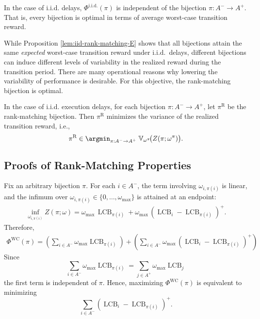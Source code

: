 \documentclass[opre,blindrev]{informs3}
\newcommand{\LCB}{\operatorname{LCB}}
\begin{document}
\begin{APPENDICES}
\begin{proposition}
\label{lem:iid-rank-matching-E}
In the case of i.i.d. delays, \(\Phi^{\mathrm{i.i.d.}}(\pi)\) is independent of the bijection \(\pi:A^-\to A^+\). That is, every bijection is optimal in terms of average worst-case transition reward.
\end{proposition}

While Proposition \ref{lem:iid-rank-matching-E} shows that all bijections attain the same \emph{expected} worst-case transition reward under i.i.d.\ delays, different bijections can induce different levels of variability in the realized reward during the transition period. There are many operational reasons why lowering the variability of performance is desirable. For this objective, the rank-matching bijection is optimal.

\begin{proposition}\label{lem:iid-rank-matching-Var} 
In the case of i.i.d. execution delays, for each bijection \(\pi:A^-\to A^+\), let \(\pi^{\mathrm{R}}\) be the rank-matching bijection. Then \(\pi^{\mathrm{R}}\) minimizes the variance of the realized transition reward, i.e., 
    \[
    \pi^{\mathrm{R}} \in \argmin_{\pi:A^-\to A^+}\; \mathbb{V}_{\omega^{\pi}}\!\bigl(Z(\pi;\omega^{\pi})\bigr).
    \]
\end{proposition}

\subsection{Proofs of Rank-Matching Properties}

    Fix an arbitrary bijection \(\pi\). For each \(i\in A^-\), the term involving \(\omega_{i,\pi(i)}\) is linear, and the infimum over \(\omega_{i,\pi(i)}\in\{0,\dots,\omega_{\max}\}\) is attained at an endpoint:
    \begin{eqnarray*}
    \inf_{\omega_{i,\pi(i)}}Z(\pi;\omega )=
       \omega_{\max}\,\LCB_{\pi(i)} + \omega_{\max}\,(\LCB_i-\LCB_{\pi(i)})^+.
    \end{eqnarray*}
    Therefore, 
   \begin{eqnarray*}
        \Phi^{\mathrm{WC}}(\pi)= \left(\sum_{i\in A^-}\omega_{\max}\LCB_{\pi(i)}\right)+ \left(\sum_{i\in A^-}\omega_{\max}\,(\LCB_i-\LCB_{\pi(i)})^+\right)
    \end{eqnarray*}
    Since
    \[\sum_{i\in A^-}\omega_{\max}\LCB_{\pi(i)}=\sum_{j\in A^+}\omega_{\max}\LCB_j\]
    the first term is independent of \(\pi\). Hence, maximizing \(\Phi^{\mathrm{WC}}(\pi)\) is equivalent to minimizing
    \[
        \sum_{i\in A^-} (\LCB_i-\LCB_{\pi(i)})^+.
    \]
    

\end{APPENDICES}
\end{document}
